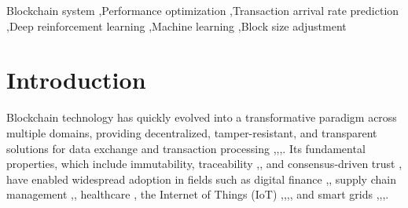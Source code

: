 \documentclass[a4paper,fleqn]{cas-dc}
\begin{document}
	\begin{keywords}
		Blockchain system \sep Performance optimization \sep Transaction arrival rate prediction \sep Deep reinforcement learning \sep Machine learning \sep Block size adjustment
	\end{keywords}
	
	\maketitle
	
\section{Introduction}

Blockchain technology has quickly evolved into a transformative paradigm across multiple domains, providing decentralized, tamper-resistant, and transparent solutions for data exchange and transaction processing \citep{10824862},\citep{akanfe2024blockchain},\citep{jie2023secure},\citep{lin2024computing}. Its fundamental properties, which include immutability, traceability \citep{huang2025blockchain},\citep{zhang2023secure}, and consensus-driven trust \citep{xu2023survey}, have enabled widespread adoption in fields such as digital finance \citep{gan2024trust},\citep{javaid2022review}, supply chain management \citep{chen2021bidm},\citep{cui2023dschain}, healthcare \citep{ramzan2022healthcare}, the Internet of Things (IoT) \citep{gaiblock2022blockchain},\citep{gai2019privacy},\citep{huang2022blocksense},\citep{el2024ddos}, and smart grids \citep{deebak2022lightweight},\citep{wang2019energy},\citep{zhou2019secure},\citep{khoa2024collaborative}.
\end{document}
